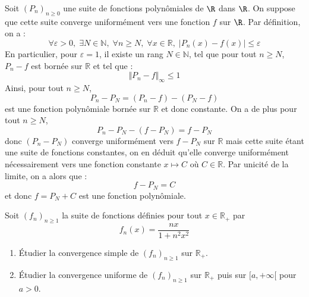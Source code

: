 \documentclass[a4paper,10pt]{report}
\begin{document}
\corr Soit $(P_{n})_{n \geq 0}$ une suite de fonctions polynômiales de $\R$ dans $\R$. On suppose que cette suite converge uniformément vers une fonction $f$ sur $\R$. Par définition, on a :
$$ \forall \varepsilon >0, \; \exists N \in \mathbb{N}, \; \forall n \geq N, \;  \forall x \in \mathbb{R}, \; \vert P_n(x)-f(x) \vert \leq \varepsilon$$
En particulier, pour $\varepsilon=1$, il existe un rang $N \in \mathbb{N}$, tel que pour tout $n \geq N$, $P_n-f$ est bornée sur $\mathbb{R}$ et tel que :
$$ \Vert P_n- f \Vert_{\infty} \leq 1$$
Ainsi, pour tout $n \geq N$,
$$ P_n-P_N = (P_n-f)-(P_N-f)$$
est une fonction polynômiale bornée sur $\mathbb{R}$ et donc constante. On a de plus pour tout $n \geq N$,
$$ P_n-P_N - (f-P_N) = f-P_N$$
donc $(P_n-P_N)$ converge uniformément vers $f-P_N$ sur $\mathbb{R}$ mais cette suite étant une suite de fonctions constantes, on en déduit qu'elle converge uniformément nécessairement vers une fonction constante $x \mapsto C$ où $C \in \mathbb{R}$. Par unicité de la limite, on a alors que :
$$ f-P_N=C$$
et donc $f=P_N+C$ est une fonction polynômiale.

\begin{Exercice}{} Soit $(f_n)_{n \geq 1}$ la suite de fonctions définies pour tout $x \in \mathbb{R}_+$ par 
$$f_n(x) = \frac {nx}{1+n^2x^2}$$
\begin{enumerate}
\item Étudier la convergence simple de $(f_n)_{n \geq 1}$ sur $\mathbb{R}_+$.
\item Étudier la convergence uniforme de $(f_n)_{n \geq 1}$ sur $\mathbb{R}_+$ puis sur $[a, + \infty[$ pour $a>0$.
\end{enumerate}
\end{Exercice}

\corr 
\end{document}
